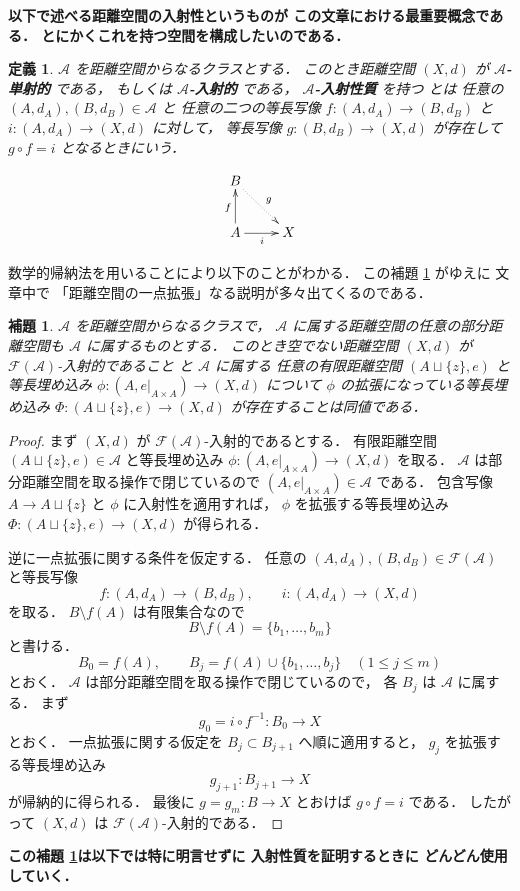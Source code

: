 \documentclass[leqno, 12pt]{jsarticle}
\newtheorem{lem}[thm]{補題}
\newtheorem{df}[thm]{定義}
\newcommand{\FinitePart}[1]{\mathscr{F}(#1)}
\newcommand{\restr}[2]{#1|_{#2}}
\begin{document}
\textbf{以下で述べる距離空間の入射性というものが
この文章における最重要概念である．%
とにかくこれを持つ空間を構成したいのである．%
}


\begin{df}\label{df:intro:inj}
$\mathscr{A}$
を距離空間からなるクラスとする．
このとき距離空間
$(X, d)$
が
\textbf{%
$\mathscr{A}$-単射的}
である，
もしくは
\textbf{%
$\mathscr{A}$-入射的}
である，
\textbf{%
$\mathscr{A}$-入射性質}
を持つ
とは
任意の
$(A, d_A), (B, d_B)\in \mathscr{A}$
と
任意の二つの等長写像
$f\colon  (A, d_A)\to (B, d_B)$
と
$i\colon (A, d_A)\to (X, d)$
に対して，
等長写像
$g\colon  (B, d_B)\to (X, d)$
が存在して
$g\circ f=i$
となるときにいう．


\[
\xymatrix{
B \ar@{.>}[dr]^{g} & \\
A \ar[r]_i \ar[u]^f & X
}
\]
\end{df}

数学的帰納法を用いることにより以下のことがわかる．
この補題
\ref{lem:intro:kihon}
がゆえに
文章中で
「距離空間の一点拡張」なる説明が多々出てくるのである．
\begin{lem}\label{lem:intro:kihon}
$\mathscr{A}$
を距離空間からなるクラスで，
$\mathscr A$
に属する距離空間の任意の部分距離空間も
$\mathscr A$
に属するものとする．
このとき空でない距離空間
$(X, d)$
が
$\FinitePart{\mathscr{A}}$-入射的であること
と
$\mathscr{A}$
に属する
任意の有限距離空間
$(A\sqcup\{z\}, e)$
と等長埋め込み
$\phi\colon
\left(A, \restr{e}{A\times A}\right)\to (X, d)$
について
$\phi$
の拡張になっている等長埋め込み
$\Phi\colon  (A\sqcup\{z\}, e)\to (X, d)$
が存在することは同値である．
\end{lem}
\begin{proof}
まず
$(X,d)$
が
$\FinitePart{\mathscr A}$-入射的であるとする．
有限距離空間
$(A\sqcup\{z\},e)\in\mathscr A$
と等長埋め込み
$\phi\colon
\left(A,\restr{e}{A\times A}\right)
\longrightarrow(X,d)$
を取る．
$\mathscr A$
は部分距離空間を取る操作で閉じているので
$\left(A,\restr{e}{A\times A}\right)\in\mathscr A$
である．
包含写像
$A\to A\sqcup\{z\}$
と
$\phi$
に入射性を適用すれば，
$\phi$
を拡張する等長埋め込み
$\Phi\colon(A\sqcup\{z\},e)\longrightarrow(X,d)$
が得られる．

逆に一点拡張に関する条件を仮定する．
任意の
$(A,d_A),(B,d_B)\in\FinitePart{\mathscr A}$
と等長写像
\[
f\colon(A,d_A)\longrightarrow(B,d_B),
\qquad
i\colon(A,d_A)\longrightarrow(X,d)
\]
を取る．
$B\setminus f(A)$
は有限集合なので
\[
B\setminus f(A)=\{b_1,\dots,b_m\}
\]
と書ける．
\[
B_0=f(A),
\qquad
B_j=f(A)\cup\{b_1,\dots,b_j\}
\quad(1\le j\le m)
\]
とおく．
$\mathscr A$
は部分距離空間を取る操作で閉じているので，
各
$B_j$
は
$\mathscr A$
に属する．
まず
\[
g_0=i\circ f^{-1}\colon B_0\longrightarrow X
\]
とおく．
一点拡張に関する仮定を
$B_j\subset B_{j+1}$
へ順に適用すると，
$g_j$
を拡張する等長埋め込み
\[
g_{j+1}\colon B_{j+1}\longrightarrow X
\]
が帰納的に得られる．
最後に
$g=g_m\colon B\to X$
とおけば
$g\circ f=i$
である．
したがって
$(X,d)$
は
$\FinitePart{\mathscr A}$-入射的である．
\end{proof}
\textbf{この補題 \ref{lem:intro:kihon}は以下では特に明言せずに
入射性質を証明するときに
どんどん使用していく．%
}
\end{document}
